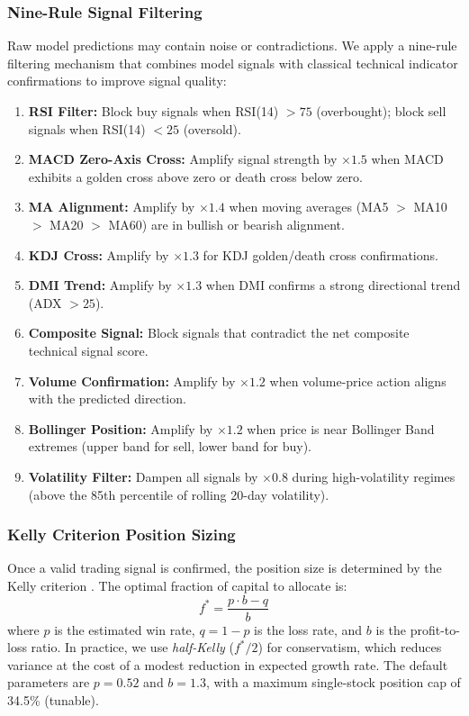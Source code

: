 \documentclass[12pt, a4paper]{article}
\begin{document}
\subsubsection{Nine-Rule Signal Filtering}

Raw model predictions may contain noise or contradictions. We apply a nine-rule filtering mechanism that combines model signals with classical technical indicator confirmations to improve signal quality:

\begin{enumerate}[leftmargin=2em]
    \item \textbf{RSI Filter:} Block buy signals when RSI(14) $> 75$ (overbought); block sell signals when RSI(14) $< 25$ (oversold).
    \item \textbf{MACD Zero-Axis Cross:} Amplify signal strength by $\times 1.5$ when MACD exhibits a golden cross above zero or death cross below zero.
    \item \textbf{MA Alignment:} Amplify by $\times 1.4$ when moving averages (MA5 $>$ MA10 $>$ MA20 $>$ MA60) are in bullish or bearish alignment.
    \item \textbf{KDJ Cross:} Amplify by $\times 1.3$ for KDJ golden/death cross confirmations.
    \item \textbf{DMI Trend:} Amplify by $\times 1.3$ when DMI confirms a strong directional trend (ADX $> 25$).
    \item \textbf{Composite Signal:} Block signals that contradict the net composite technical signal score.
    \item \textbf{Volume Confirmation:} Amplify by $\times 1.2$ when volume-price action aligns with the predicted direction.
    \item \textbf{Bollinger Position:} Amplify by $\times 1.2$ when price is near Bollinger Band extremes (upper band for sell, lower band for buy).
    \item \textbf{Volatility Filter:} Dampen all signals by $\times 0.8$ during high-volatility regimes (above the 85th percentile of rolling 20-day volatility).
\end{enumerate}

\subsubsection{Kelly Criterion Position Sizing}

Once a valid trading signal is confirmed, the position size is determined by the Kelly criterion \citep{kelly1956new}. The optimal fraction of capital to allocate is:
\begin{equation}
f^* = \frac{p \cdot b - q}{b}
\end{equation}
where $p$ is the estimated win rate, $q = 1 - p$ is the loss rate, and $b$ is the profit-to-loss ratio. In practice, we use \emph{half-Kelly} ($f^*/2$) for conservatism, which reduces variance at the cost of a modest reduction in expected growth rate. The default parameters are $p = 0.52$ and $b = 1.3$, with a maximum single-stock position cap of 34.5\% (tunable).
\end{document}
